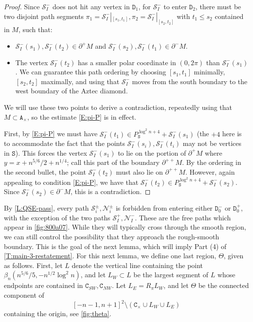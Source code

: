 \documentclass[11pt,twoside]{amsart}
\theoremstyle{plain}
\numberwithin{quest}{section}
\theoremstyle{remark}
\numberwithin{rem}{section}
\theoremstyle{definition}
\newcommand{\cS}{\mathcal{S}}
\newcommand{\cN}{\mathcal{N}}
\renewcommand{\tt}[1]{{\mathtt{#1}}}
\begin{document}
\begin{proof}
		Since $\cS_I^-$ does not hit any vertex in $\tt{D}_1$, for $\cS_I^-$ to enter $\tt{D}_2$, there must be two disjoint path segments $\pi_1 = \cS_I^-|_{[s_1, t_1]}, \pi_2 = \cS_I^-|_{[s_2, t_2]}$ with $t_1 \le s_2$ contained in $M$, such that:
		\begin{itemize}
			\item $\cS_I^-(s_1), \cS_I^-(t_2) \in \partial^+ M$ and $\cS_I^-(s_2), \cS_I^-(t_1) \in \partial^- M$.
			\item The vertex $\cS_I^-(t_2)$ has a smaller polar coordinate in $(0, 2 \pi)$ than $\cS_I^-(s_1)$. We can guarantee this path ordering by choosing $[s_1, t_1]$ minimally, $[s_2, t_2]$ maximally, and using that $\cS_I^-$ moves from the south boundary to the west boundary of the Aztec diamond.
		\end{itemize}
		We will use these two points to derive a contradiction,  repeatedly using that $M \subset \tt{A}_\times$, so the estimate \eqref{E:pi-P} is in effect.
		
		First, by \eqref{E:pi-P} we must have $\cS_I^-(t_1) \in P_\tt{S}^{\log^2 n + 4} + \cS_I^-(s_1)$ (the $+ 4$ here is to accommodate the fact that the points $\cS_I^-(s_i), \cS_I^-(t_i)$ may not be vertices in $\tt{S}$). This forces the vertex $\cS_I^-(s_1)$ to lie on the portion of $\partial^{+} M$ where $y = x + n^{5/6}/2 + n^{1/4}$; call this part of the boundary $\partial^{++} M$. By the ordering in the second bullet, the point $\cS_I^-(t_2)$ must also lie on $\partial^{++} M$. However, again appealing to condition \eqref{E:pi-P}, we have that $\cS_I^-(t_2) \in P_\tt{S}^{\log^2 n + 4} + \cS_I^-(s_2)$. Since $\cS_I^-(s_2) \in \partial^- M$, this is a contradiction.
	\end{proof}
	
	By \cref{L:QSE-pass}, every path $\cS_i^\pm, \cN_i^\pm$ is forbidden from entering either $\tt{D}_0^-$ or $\tt{D}_0^+$, with the exception of the two paths $\cS_I^+, \cN_I^-$. These are the free paths which appear in \cref{fig:800a07}. While they will typically cross through the smooth region, we can still control the possibility that they approach the rough-smooth boundary. This is the goal of the next lemma, which will imply Part (4) of \cref{T:main-3-restatement}. For this next lemma, we define one last region, $\Theta$, given as follows. First, let $L$ denote the vertical line containing the point $\beta_n(n^{5/6}/5, -n^{1/2}\log^2 n)$, and let $L_W \subset L$ be the largest segment of $L$ whose endpoints are contained in $\tt{C}_{SW}, \tt{C}_{NW}$. Let $L_E = R_\pi L_W$, and let $\Theta$ be the connected component of 
	$$
	[-n - 1, n + 1]^2 \setminus (\tt{C}_\times \cup L_W \cup L_E)
	$$
	containing the origin, see \cref{fig:theta}.
\end{document}
